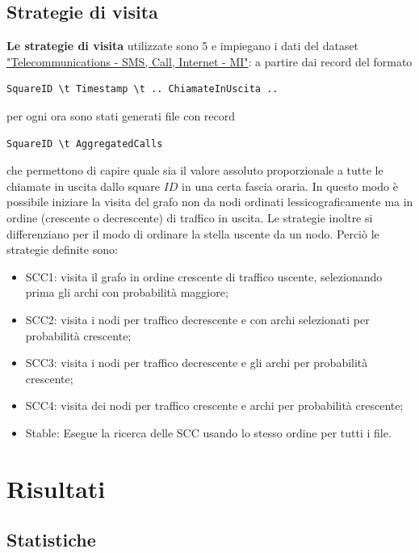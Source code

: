 \documentclass[10pt,a4paper]{article}
\begin{document}
\subsection{Strategie di visita}
\textbf{Le strategie di visita} utilizzate sono 5 e impiegano i dati del dataset 
\href{https://dandelion.eu/datagem/telecom-sms-call-internet-mi/description/}{"Telecommunications - SMS, Call, Internet - MI"}:
a partire dai record del formato
\begin{verbatim}
SquareID \t Timestamp \t .. ChiamateInUscita ..
\end{verbatim}
per ogni ora sono stati generati file con record
\begin{verbatim}
SquareID \t AggregatedCalls
\end{verbatim}
che permettono di capire quale sia il valore assoluto proporzionale a tutte le chiamate in uscita dallo square
$ID$ in una certa fascia oraria.
In questo modo è possibile iniziare la visita del grafo non da nodi ordinati lessicograficamente ma in ordine
(crescente o decrescente) di traffico in uscita.
Le strategie inoltre si differenziano per il modo di ordinare la stella uscente da un nodo.
Perciò le strategie definite sono:
\begin{itemize}
\item SCC1: visita il grafo in ordine crescente di traffico uscente,
selezionando prima gli archi con probabilità maggiore;
\item SCC2: visita i nodi per traffico decrescente e con archi selezionati per probabilità crescente;
\item SCC3: visita i nodi per traffico decrescente e gli archi per probabilità crescente;
\item SCC4: visita dei nodi per traffico crescente e archi per probabilità crescente;
\item Stable: Esegue la ricerca delle SCC usando lo stesso ordine per tutti i file. %
\end{itemize}
 
\section{Risultati}

\subsection{Statistiche}
\end{document}
